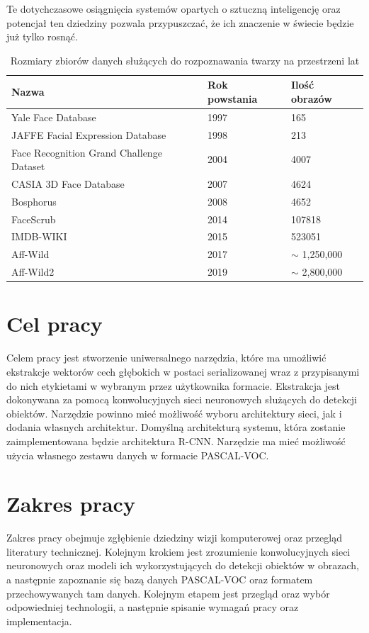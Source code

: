 \documentclass[a4paper,twoside,12pt]{book}
\begin{document}
{Te dotychczasowe osiągnięcia systemów opartych o sztuczną inteligencję oraz potencjał ten dziedziny pozwala przypuszczać, że ich znaczenie w świecie będzie już tylko rosnąć. }
 





\begin{table}
\centering
\caption{Rozmiary zbiorów danych służących do rozpoznawania twarzy na przestrzeni lat}
\begin{tabular}{|l|l|l|}
\hline
Nazwa & Rok powstania & Ilość obrazów \\
\hline
Yale Face Database\cite{Yale} & 1997 & 165 \\
JAFFE Facial Expression Database\cite{lyons1998coding}  & 1998 &  213 \\
Face Recognition Grand Challenge Dataset\cite{bowyer2006survey} & 2004 & 4007 \\
CASIA 3D Face Database\cite{Cas} & 2007 & 4624 \\
Bosphorus\cite{savran2008bosphorus} &2008& 4652 \\
FaceScrub\cite{ng2014data} & 2014 & 107818 \\
IMDB-WIKI\cite{Rothe-ICCVW-2015} & 2015 & 523051 \\
Aff-Wild \cite{zafeiriou2017aff} & 2017 & $\sim$ 1,250,000 \\
Aff-Wild2 \cite{kollias2019expression} & 2019 &$\sim$ 2,800,000 \\
\end{tabular}

\label{tab:datasets}
\end{table}  

\section{Cel pracy}
{Celem pracy jest stworzenie uniwersalnego narzędzia, które ma umożliwić ekstrakcje wektorów cech głębokich w postaci serializowanej wraz z przypisanymi do nich etykietami w wybranym przez użytkownika formacie. Ekstrakcja jest dokonywana za pomocą konwolucyjnych sieci neuronowych służących do detekcji obiektów. Narzędzie powinno mieć możliwość wyboru architektury sieci, jak i dodania własnych architektur. Domyślną architekturą systemu, która zostanie zaimplementowana będzie architektura R-CNN. Narzędzie ma mieć możliwość użycia własnego zestawu danych w formacie PASCAL-VOC.}
\section{Zakres pracy}
{Zakres pracy obejmuje zgłębienie dziedziny wizji komputerowej oraz przegląd literatury technicznej. Kolejnym krokiem jest zrozumienie konwolucyjnych sieci neuronowych oraz modeli ich wykorzystujących do detekcji obiektów w obrazach, a następnie zapoznanie się bazą danych PASCAL-VOC oraz formatem przechowywanych tam danych. Kolejnym etapem jest przegląd oraz wybór odpowiedniej technologii, a następnie spisanie wymagań pracy oraz implementacja. }
\end{document}
